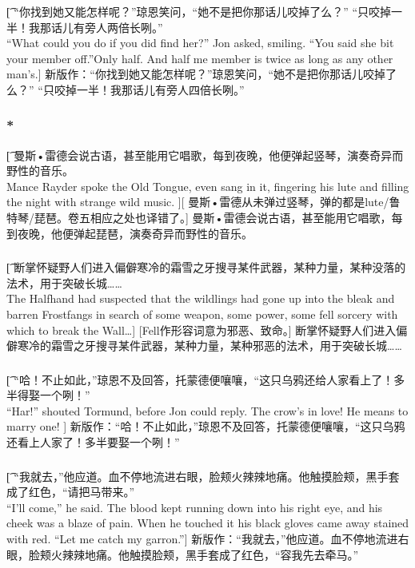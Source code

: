 \documentclass[12pt,a4paper]{article}
\begin{document}
\subsubsection{}\t[
	 “你找到她又能怎样呢？”琼恩笑问，“她不是把你那话儿咬掉了么？” “只咬掉一半！我那话儿有旁人两倍长咧。” \\
	 “What could you do if you did find her?” Jon asked, smiling. “You said she bit your member off.”Only half. And half me member is twice as long as any other man's.]
	 新版作：“你找到她又能怎样呢？”琼恩笑问，“她不是把你那话儿咬掉了么？” “只咬掉一半！我那话儿有旁人四倍长咧。” 
	 
\subsubsection{\color{red}*}\t[
	曼斯•雷德会说古语，甚至能用它唱歌，每到夜晚，他便弹起竖琴，演奏奇异而野性的音乐。\\
	Mance Rayder spoke the Old Tongue, even sang in it, fingering his lute and filling the night with strange wild music. ][
	曼斯•雷德从未弹过竖琴，弹的都是lute/鲁特琴/琵琶。卷五相应之处也译错了。]
	曼斯•雷德会说古语，甚至能用它唱歌，每到夜晚，他便弹起琵琶，演奏奇异而野性的音乐。

\subsubsection{}\t[		
断掌怀疑野人们进入偏僻寒冷的霜雪之牙搜寻某件武器，某种力量，某种没落的法术，用于突破长城……\\		
The Halfhand had suspected that the wildlings had gone up into the bleak and barren Frostfangs in search of some weapon, some power, some fell sorcery with which to break the Wall\ldots]		
[Fell作形容词意为邪恶、致命。]		
断掌怀疑野人们进入偏僻寒冷的霜雪之牙搜寻某件武器，某种力量，某种邪恶的法术，用于突破长城……
	
\subsubsection{}\t[
	“哈！不止如此，”琼恩不及回答，托蒙德便嚷嚷，“这只乌鸦还给人家看上了！多半得娶一个咧！” \\
	“Har!” shouted Tormund, before Jon could reply. The crow's in love! He means to marry one! ]
	新版作：“哈！不止如此，”琼恩不及回答，托蒙德便嚷嚷，“这只乌鸦还看上人家了！多半要娶一个咧！” 
	
\subsubsection{}\t[
	“我就去，”他应道。血不停地流进右眼，脸颊火辣辣地痛。他触摸脸颊，黑手套成了红色，“请把马带来。”\\
	“I'll come,” he said. The blood kept running down into his right eye, and his cheek was a blaze of pain. When he touched it his black gloves came away stained with red. “Let me catch my garron.”]
	新版作：“我就去，”他应道。血不停地流进右眼，脸颊火辣辣地痛。他触摸脸颊，黑手套成了红色，“容我先去牵马。”
\end{document}
